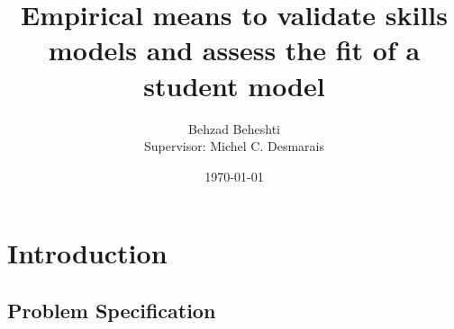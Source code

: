 \documentclass{beamer}
\begin{document}
\title{Empirical means to validate skills models and assess the fit of a student model}  
\author{Behzad Beheshti\\{\footnotesize Supervisor: Michel C. Desmarais} }
\date{\today} 

\begin{frame}
\titlepage
\end{frame}




\section{Introduction}
\subsection{Problem Specification}
\end{document}
